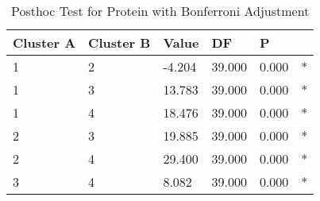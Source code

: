 \begin{table}[h]
\caption{Posthoc Test for Protein with Bonferroni Adjustment}
\label{tab:posthoc_Protein}
\begin{tabular}{llllll}
\toprule
Cluster A & Cluster B & Value & DF & P &   \\
\midrule
1 & 2 & -4.204 & 39.000 & 0.000 & * \\
1 & 3 & 13.783 & 39.000 & 0.000 & * \\
1 & 4 & 18.476 & 39.000 & 0.000 & * \\
2 & 3 & 19.885 & 39.000 & 0.000 & * \\
2 & 4 & 29.400 & 39.000 & 0.000 & * \\
3 & 4 & 8.082 & 39.000 & 0.000 & * \\
\bottomrule
\end{tabular}
\end{table}
